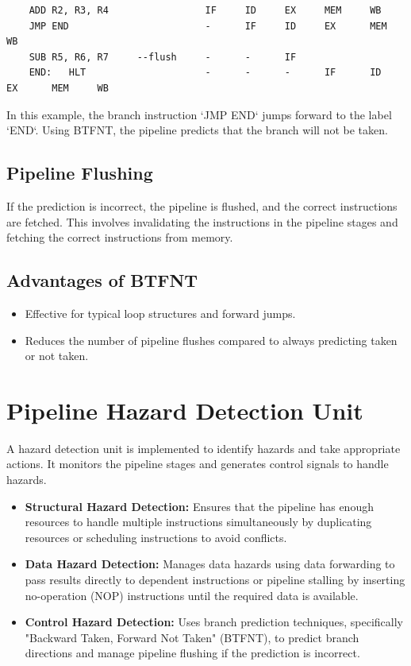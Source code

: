 \documentclass{report}
\begin{document}
\begin{verbatim}
    ADD R2, R3, R4                 IF     ID     EX     MEM     WB
    JMP END                        -      IF     ID     EX      MEM     WB
    SUB R5, R6, R7     --flush     -      -      IF
    END:   HLT                     -      -      -      IF      ID      EX      MEM     WB
\end{verbatim}
In this example, the branch instruction `JMP END` jumps forward to the label `END`. Using BTFNT, the pipeline predicts that the branch will not be taken.

\subsection*{Pipeline Flushing}
If the prediction is incorrect, the pipeline is flushed, and the correct instructions are fetched. This involves invalidating the instructions in the pipeline stages and fetching the correct instructions from memory.

\subsection*{Advantages of BTFNT}
\begin{itemize}
    \item Effective for typical loop structures and forward jumps.
    \item Reduces the number of pipeline flushes compared to always predicting taken or not taken.
\end{itemize}

\section*{Pipeline Hazard Detection Unit}
A hazard detection unit is implemented to identify hazards and take appropriate actions. It monitors the pipeline stages and generates control signals to handle hazards.

\begin{itemize}
    \item \textbf{Structural Hazard Detection:} Ensures that the pipeline has enough resources to handle multiple instructions simultaneously by duplicating resources or scheduling instructions to avoid conflicts.
    \item \textbf{Data Hazard Detection:} Manages data hazards using data forwarding to pass results directly to dependent instructions or pipeline stalling by inserting no-operation (NOP) instructions until the required data is available.
    \item \textbf{Control Hazard Detection:} Uses branch prediction techniques, specifically "Backward Taken, Forward Not Taken" (BTFNT), to predict branch directions and manage pipeline flushing if the prediction is incorrect.
\end{itemize}
\end{document}
